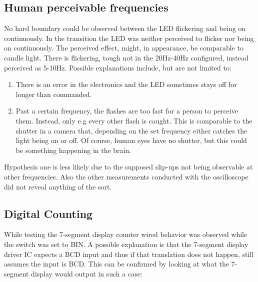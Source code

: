 \documentclass[fleqn,14pt]{article}
\begin{document}
\subsection{Human perceivable frequencies}
No hard boundary could be observed between the LED flickering and being on continuously. In the transition
the LED was neither perceived to flicker nor being on continuously.
The perceived effect, might, in appearance, be comparable to candle light. There is flickering, tough not
in the 20Hz-40Hz configured, instead perceived as 5-10Hz. Possible explanations include, but are not limited
to:

\begin{enumerate}
  \item There is an error in the electronics and the LED sometimes stays off for longer than commanded.
  \item Past a certain frequency, the flashes are too fast for a person to perceive them. Instead, only
  e.g every other flash is caught. This is comparable to the shutter in a camera that, depending on the set frequency
  either catches the light being on or off. Of course, human eyes have no shutter, but this could be something
  happening in the brain.
\end{enumerate}

Hypothesis one is less likely due to the supposed slip-ups not being observable
at other frequencies. Also the other measurements conducted with the oscilloscope did not reveal anything
of the sort.

\subsection{Digital Counting}
While testing the 7-segment display counter wired behavior was observed while the switch was set to BIN.
A possible explanation is that the 7-segment display driver IC expects a BCD input and thus if that translation
does not happen, still assumes the input is BCD. This can be confirmed by looking at what the 7-segment display
would output in such a case:
\end{document}
